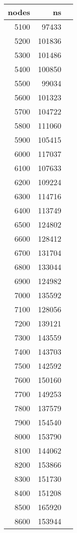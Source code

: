 \begin{figure}[H]
\begin{tabular}{r r r}
        \bottomrule
    \end{tabular}
    \quad
    \begin{tabular}{r r r}
        \toprule
        \textbf{nodes} & \textbf{ns} \\
        \midrule
        5100 & 97433 \\
        5200 & 101836 \\
        5300 & 101486 \\
        5400 & 100850 \\
        5500 & 99034 \\
        5600 & 101323 \\
        5700 & 104722 \\
        5800 & 111060 \\
        5900 & 105415 \\
        6000 & 117037 \\
        6100 & 107633 \\
        6200 & 109224 \\
        6300 & 114716 \\
        6400 & 113749 \\
        6500 & 124802 \\
        6600 & 128412 \\
        6700 & 131704 \\
        6800 & 133044 \\
        6900 & 124982 \\
        7000 & 135592 \\
        7100 & 128056 \\
        7200 & 139121 \\
        7300 & 143559 \\
        7400 & 143703 \\
        7500 & 142592 \\
        7600 & 150160 \\
        7700 & 149253 \\
        7800 & 137579 \\
        7900 & 154540 \\
        8000 & 153790 \\
        8100 & 144062 \\
        8200 & 153866 \\
        8300 & 151730 \\
        8400 & 151208 \\
        8500 & 165920 \\
        8600 & 153944 \\

\end{tabular}
\end{figure}
